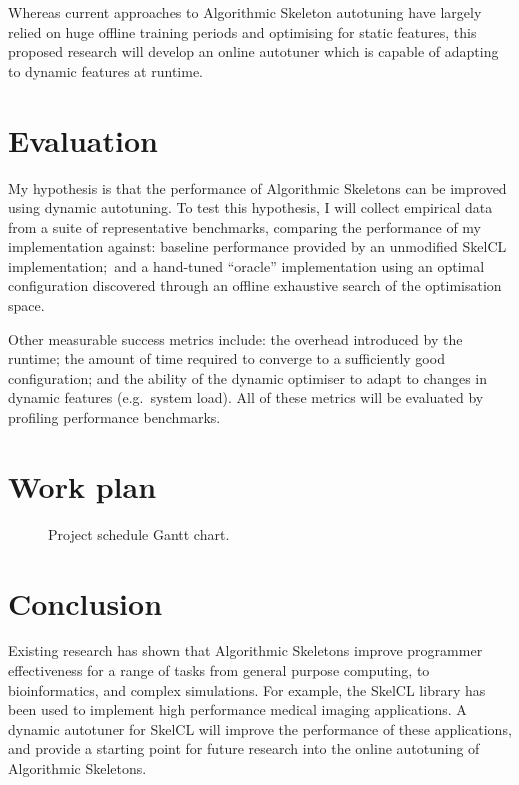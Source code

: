 Whereas current approaches to Algorithmic Skeleton autotuning have
largely relied on huge offline training periods and optimising for
static features, this proposed research will develop an online
autotuner which is capable of adapting to dynamic features at runtime.

\section{Evaluation}

My hypothesis is that the performance of Algorithmic Skeletons can be
improved using dynamic autotuning. To test this hypothesis, I will
collect empirical data from a suite of representative benchmarks,
comparing the performance of my implementation against: baseline
performance provided by an unmodified SkelCL implementation;\ and a
hand-tuned ``oracle'' implementation using an optimal configuration
discovered through an offline exhaustive search of the optimisation
space.

Other measurable success metrics include: the overhead introduced by
the runtime; the amount of time required to converge to a sufficiently
good configuration; and the ability of the dynamic optimiser to adapt
to changes in dynamic features (e.g.\ system load). All of these
metrics will be evaluated by profiling performance benchmarks.

\cite{Georges2007}

\section{Work plan}

\begin{figure}[H]

\caption{Project schedule Gantt chart.}
\label{fig:gantt}
\end{figure}

\section{Conclusion}
Existing research has shown that Algorithmic Skeletons improve
programmer effectiveness for a range of tasks from general purpose
computing, to bioinformatics, and complex simulations. For example,
the SkelCL library has been used to implement high performance medical
imaging applications. A dynamic autotuner for SkelCL will improve the
performance of these applications, and provide a starting point for
future research into the online autotuning of Algorithmic Skeletons.

